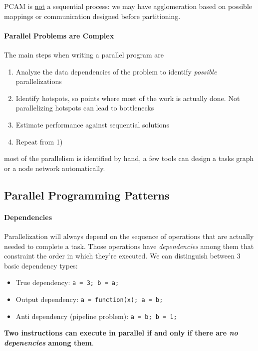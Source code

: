 \documentclass{article}
\begin{document}
			PCAM is \underline{not} a sequential process: we may have agglomeration based on possible mappings or communication designed before partitioning.

			\paragraph{Parallel Problems are Complex}
				The main steps when writing a parallel program are 
				\begin{enumerate}
					\item Analyze the data dependencies of the problem to identify \textit{possible} parallelizations
					\item Identify hotspots, so points where most of the work is actually done. Not parallelizing hotspots can lead to bottlenecks
					\item Estimate performance against sequential solutions
					\item Repeat from 1)
				\end{enumerate}
				most of the parallelism is identified by hand, a few tools can design a tasks graph or a node network automatically.
		
		\subsection{Parallel Programming Patterns}
			\paragraph{Dependencies}
				Parallelization will always depend on the sequence of operations that are actually needed to complete a task. Those operations have \textit{dependencies} among them that constraint the order in which they're executed. We can distinguish between 3 basic dependency types:
				\begin{itemize}
					\item True dependency: \verb|a = 3; b = a;|
			 		\item Output dependency: \verb|a = function(x); a = b;|
					\item Anti dependency (pipeline problem): \verb|a = b; b = 1;|
				\end{itemize}
				\textbf{Two instructions can execute in parallel if and only if there are \textit{no depenencies} among them}.
			
\end{document}
